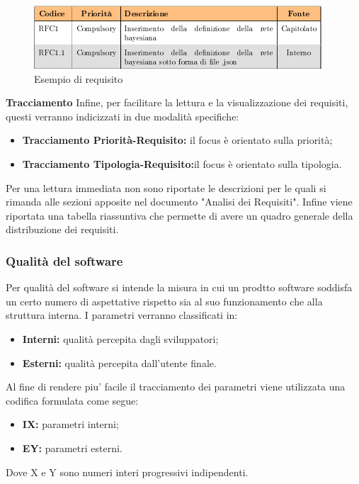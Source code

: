 	    \begin{figure}[!htbp]
	    	\centering
	    	\includegraphics{requisiti.png}
	    	\caption{Esempio di requisito}
	    \end{figure}
	    
	    \textbf{Tracciamento} Infine, per facilitare la lettura e la visualizzazione dei requisiti, questi verranno indicizzati in due modalità specifiche:
	    \begin{itemize}
	    	\item \textbf{Tracciamento Priorità-Requisito:} il focus è orientato sulla priorità;
	    	\item \textbf{Tracciamento Tipologia-Requisito:}il focus è orientato sulla tipologia.\newline
	    \end{itemize}
	    Per una lettura immediata non sono riportate le descrizioni per le quali si rimanda alle sezioni apposite nel documento "Analisi dei Requisiti".
	    Infine viene riportata una tabella riassuntiva che permette di avere un quadro generale della distribuzione dei requisiti.\newline
\subsubsection{Qualità del software}
Per qualità del software si intende la misura in cui un prodtto software soddisfa un certo numero di aspettative rispetto sia al suo funzionamento che alla struttura interna. I parametri verranno classificati in:
\begin{itemize}
    \item{\textbf{Interni:} qualità percepita dagli sviluppatori;}
    \item{\textbf{Esterni:} qualità percepita dall'utente finale.}
\end{itemize}
Al fine di rendere piu' facile il tracciamento dei parametri viene utilizzata una codifica formulata come segue:
\begin{itemize}
    \item{\textbf{IX:} parametri interni;}
    \item{\textbf{EY:} parametri esterni.}
\end{itemize}
Dove X e Y sono numeri interi progressivi indipendenti.
